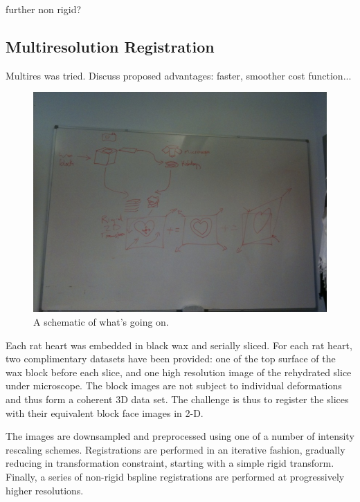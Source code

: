     further non rigid?
  
  \subsection{Multiresolution Registration} %
  \label{sub:multiresolution_registration}
    Multires was tried. Discuss proposed advantages: faster, smoother cost function...
  
  \begin{figure}[htbp]
    \centering
    \includegraphics[height=0.7\textwidth]{Ch6/Figs/process_diagram}
    \caption{A schematic of what's going on.}
  \end{figure}
  
  Each rat heart was embedded in black wax and serially sliced. For each rat heart, two complimentary datasets have been provided: one of the top surface of the wax block before each slice, and one high resolution image of the rehydrated slice under microscope. The block images are not subject to individual deformations and thus form a coherent 3D data set. The challenge is thus to register the slices with their equivalent block face images in 2-D.
  
  The images are downsampled and preprocessed using one of a number of intensity rescaling schemes. Registrations are performed in an iterative fashion, gradually reducing in transformation constraint, starting with a simple rigid transform. Finally, a series of non-rigid bspline registrations are performed at progressively higher resolutions.
   
